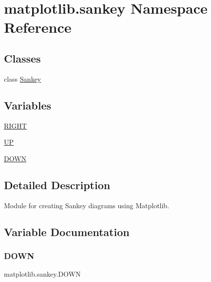 \hypertarget{namespacematplotlib_1_1sankey}{}\section{matplotlib.\+sankey Namespace Reference}
\label{namespacematplotlib_1_1sankey}
\subsection*{Classes}
\begin{DoxyCompactItemize}
\item 
class \hyperlink{classmatplotlib_1_1sankey_1_1Sankey}{Sankey}
\end{DoxyCompactItemize}
\subsection*{Variables}
\begin{DoxyCompactItemize}
\item 
\hyperlink{namespacematplotlib_1_1sankey_a6aff96770c6f8afa8a7647a077806f86}{R\+I\+G\+HT}
\item 
\hyperlink{namespacematplotlib_1_1sankey_abf402c688b23ee7416a12f0dfebc8165}{UP}
\item 
\hyperlink{namespacematplotlib_1_1sankey_a085b074d9143bd0248a3727bc40c15e8}{D\+O\+WN}
\end{DoxyCompactItemize}


\subsection{Detailed Description}
\begin{DoxyVerb}Module for creating Sankey diagrams using Matplotlib.
\end{DoxyVerb}
 

\subsection{Variable Documentation}
\mbox{\label{namespacematplotlib_1_1sankey_a085b074d9143bd0248a3727bc40c15e8}} 
\subsubsection{\texorpdfstring{D\+O\+WN}{DOWN}}
{\footnotesize\ttfamily matplotlib.\+sankey.\+D\+O\+WN}

